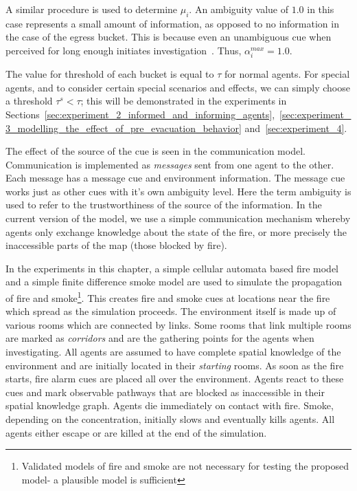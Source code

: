 A similar procedure is used to determine $\mu_{i}$. An ambiguity value of $1.0$ in this case represents a small amount of information, as opposed to no information in the case of the egress bucket. This is because even an unambiguous cue when perceived for long enough initiates investigation~\cite{Tong:1985wn}. Thus, $\alpha^{max}_{i} = 1.0$.

The value for threshold of each bucket is equal to $\tau$ for normal agents. For special agents, and to consider certain special scenarios and effects, we can simply choose a threshold $\tau^s < \tau$; this will be demonstrated in the experiments in Sections~\ref{sec:experiment_2_informed_and_informing_agents},~\ref{sec:experiment_3_modelling_the_effect_of_pre_evacuation_behavior} and~\ref{sec:experiment_4}.


The effect of the source of the cue is seen in the communication model. Communication is implemented as \emph{messages} sent from one agent to the other. Each message has a message cue and environment information. The message cue works just as other cues with it's own ambiguity level. Here the term ambiguity is used to refer to the trustworthiness of the source of the information. In the current version of the model, we use a simple communication mechanism whereby agents only exchange knowledge about the state of the fire, or more precisely the inaccessible parts of the map (those blocked by fire).

In the experiments in this chapter, a simple cellular automata based fire model and a simple finite difference smoke model are used to simulate the propagation of fire and smoke\footnote{Validated models of fire and smoke are not necessary for testing the proposed model- a plausible model is sufficient}. This creates fire and smoke cues at locations near the fire which spread as the simulation proceeds. The environment itself is made up of various rooms which are connected by links. Some rooms that link multiple rooms are marked as \emph{corridors} and are the gathering points for the agents when investigating. All agents are assumed to have complete spatial knowledge of the environment and are initially located in their \emph{starting} rooms. As soon as the fire starts, fire alarm cues are placed all over the environment. Agents react to these cues and mark observable pathways that are blocked as inaccessible in their spatial knowledge graph. Agents die immediately on contact with fire. Smoke, depending on the concentration, initially slows and eventually kills agents. All agents either escape or are killed at the end of the simulation.




